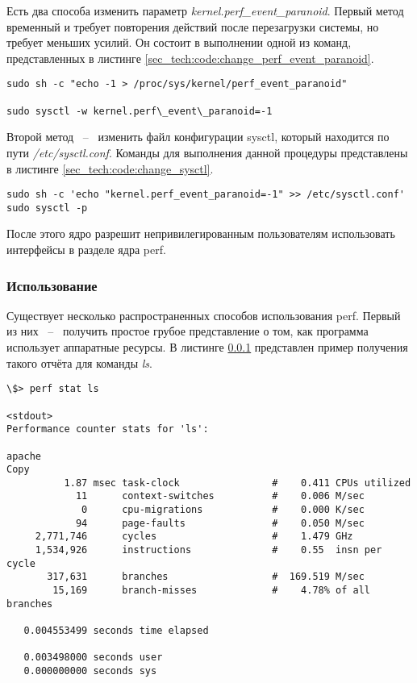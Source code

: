 Есть два способа изменить параметр \textit{kernel.perf\_event\_paranoid}.
Первый метод временный и требует повторения действий после перезагрузки системы, но требует меньших усилий.
Он состоит в выполнении одной из команд, представленных в листинге \ref{sec_tech:code:change_perf_event_paranoid}.

\begin{lstlisting}[style=CodeListing, label=sec_tech:code:change_perf_event_paranoid, caption={Способы изменения параметра}]
sudo sh -c "echo -1 > /proc/sys/kernel/perf_event_paranoid"

sudo sysctl -w kernel.perf\_event\_paranoid=-1
\end{lstlisting}

Второй метод ~--~ изменить файл конфигурации sysctl, который находится по пути \textit{/etc/sysctl.conf}.
Команды для выполнения данной процедуры представлены в листинге \ref{sec_tech:code:change_sysctl}.

\begin{lstlisting}[style=CodeListing, label=sec_tech:code:change_sysctl, caption={Правка файла конфигурации sysctl}]
sudo sh -c 'echo "kernel.perf_event_paranoid=-1" >> /etc/sysctl.conf'
sudo sysctl -p
\end{lstlisting}

После этого ядро разрешит непривилегированным пользователям использовать интерфейсы в разделе ядра perf.

\subsubsection{Использование} 

Существует несколько распространенных способов использования perf. 
Первый из них ~--~ получить простое грубое представление о том, как программа использует аппаратные ресурсы.
В листинге \ref{} представлен пример получения такого отчёта для команды \textit{ls}.

\pagebreak
\begin{lstlisting}[style=CodeListing, label=sec_tech:code:pref_stat, caption={Пример использования команды perf stat}]
\$> perf stat ls

<stdout>
Performance counter stats for 'ls':

apache
Copy
          1.87 msec task-clock                #    0.411 CPUs utilized
            11      context-switches          #    0.006 M/sec
             0      cpu-migrations            #    0.000 K/sec
            94      page-faults               #    0.050 M/sec
     2,771,746      cycles                    #    1.479 GHz
     1,534,926      instructions              #    0.55  insn per cycle
       317,631      branches                  #  169.519 M/sec
        15,169      branch-misses             #    4.78% of all branches

   0.004553499 seconds time elapsed

   0.003498000 seconds user
   0.000000000 seconds sys
\end{lstlisting}

